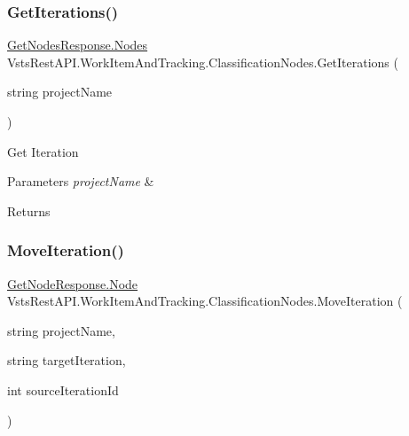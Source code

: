 \subsubsection{\texorpdfstring{Get\+Iterations()}{GetIterations()}}
{\footnotesize\ttfamily \mbox{\hyperlink{class_vsts_rest_a_p_i_1_1_viewmodel_1_1_work_item_1_1_get_nodes_response_1_1_nodes}{Get\+Nodes\+Response.\+Nodes}} Vsts\+Rest\+A\+P\+I.\+Work\+Item\+And\+Tracking.\+Classification\+Nodes.\+Get\+Iterations (\begin{DoxyParamCaption}\item[{string}]{project\+Name }\end{DoxyParamCaption})}



Get Iteration 


\begin{DoxyParams}{Parameters}
{\em project\+Name} & \\
\hline
\end{DoxyParams}
\begin{DoxyReturn}{Returns}

\end{DoxyReturn}
\mbox{\label{class_vsts_rest_a_p_i_1_1_work_item_and_tracking_1_1_classification_nodes_a34362d25882c3145b7134f08bf8aae86}} 
\subsubsection{\texorpdfstring{Move\+Iteration()}{MoveIteration()}}
{\footnotesize\ttfamily \mbox{\hyperlink{class_vsts_rest_a_p_i_1_1_viewmodel_1_1_work_item_1_1_get_node_response_1_1_node}{Get\+Node\+Response.\+Node}} Vsts\+Rest\+A\+P\+I.\+Work\+Item\+And\+Tracking.\+Classification\+Nodes.\+Move\+Iteration (\begin{DoxyParamCaption}\item[{string}]{project\+Name,  }\item[{string}]{target\+Iteration,  }\item[{int}]{source\+Iteration\+Id }\end{DoxyParamCaption})}



